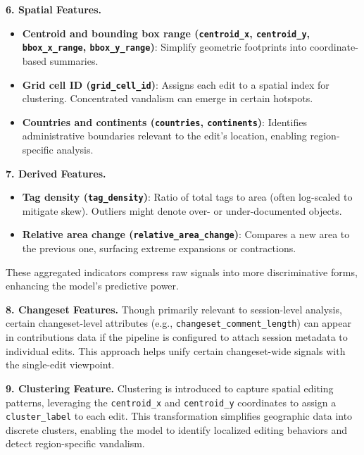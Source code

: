 \documentclass[
    13pt, %
    a4paper, %
    listof=totoc, %
    bibliography=totoc, %
    index=totoc, %
    headsepline
]{scrreprt}
\begin{document}
\newpage
\noindent
\textbf{6. Spatial Features.}
\begin{itemize}
  \item \textbf{Centroid and bounding box range (\texttt{centroid\_x}, \texttt{centroid\_y}, \newline \texttt{bbox\_x\_range}, \texttt{bbox\_y\_range})}: Simplify geometric footprints into coordinate-based summaries.
  \item \textbf{Grid cell ID (\texttt{grid\_cell\_id})}: Assigns each edit to a spatial index for clustering. Concentrated vandalism can emerge in certain hotspots.
  \item \textbf{Countries and continents (\texttt{countries}, \texttt{continents})}: Identifies administrative boundaries relevant to the edit’s location, enabling region-specific analysis.
\end{itemize}

\vspace{1em}
\noindent
\textbf{7. Derived Features.}
\begin{itemize}
  \item \textbf{Tag density (\texttt{tag\_density})}: Ratio of total tags to area (often log-scaled to mitigate skew). Outliers might denote over- or under-documented objects.
  \item \textbf{Relative area change (\texttt{relative\_area\_change})}: Compares a new area to the previous one, surfacing extreme expansions or contractions.
\end{itemize}
These aggregated indicators compress raw signals into more discriminative forms, enhancing the model’s predictive power.

\vspace{1em}
\noindent
\textbf{8. Changeset Features.}
Though primarily relevant to session-level analysis, certain changeset-level attributes (e.g., \texttt{changeset\_comment\_length}) can appear in contributions data if the pipeline is configured to attach session metadata to individual edits. This approach helps unify certain changeset-wide signals with the single-edit viewpoint.

\vspace{1em}
\noindent
\textbf{9. Clustering Feature.}
Clustering is introduced to capture spatial editing patterns, leveraging the \texttt{centroid\_x} and \texttt{centroid\_y} coordinates to assign a \texttt{cluster\_label} to each edit. This transformation simplifies geographic data into discrete clusters, enabling the model to identify localized editing behaviors and detect region-specific vandalism.
\end{document}
